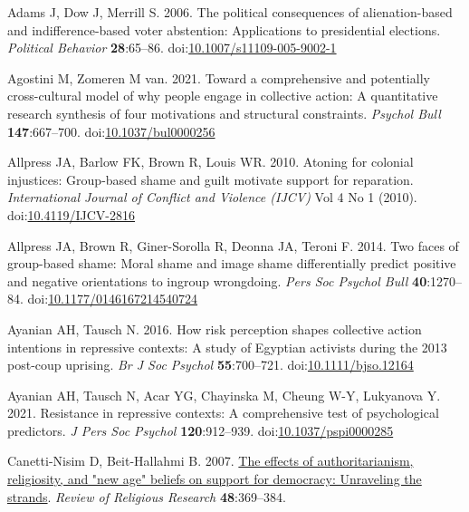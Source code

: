 \documentclass[
]{article}
\newlength{\cslhangindent}
\newenvironment{CSLReferences}[2] %
 {\begin{list}{}{%
  \setlength{\itemindent}{0pt}
  \setlength{\leftmargin}{0pt}
  \setlength{\parsep}{0pt}
  \ifodd #1
   \setlength{\leftmargin}{\cslhangindent}
   \setlength{\itemindent}{-1\cslhangindent}
  \fi
  \setlength{\itemsep}{#2\baselineskip}}}
 {\end{list}}
\begin{document}
\label{refs}
\begin{CSLReferences}{1}{0}
Adams J, Dow J, Merrill S. 2006. The political consequences of alienation-based and indifference-based voter abstention: Applications to presidential elections. \emph{Political Behavior} \textbf{28}:65--86. doi:\href{https://doi.org/10.1007/s11109-005-9002-1}{10.1007/s11109-005-9002-1}

Agostini M, Zomeren M van. 2021. Toward a comprehensive and potentially cross-cultural model of why people engage in collective action: A quantitative research synthesis of four motivations and structural constraints. \emph{Psychol Bull} \textbf{147}:667--700. doi:\href{https://doi.org/10.1037/bul0000256}{10.1037/bul0000256}

Allpress JA, Barlow FK, Brown R, Louis WR. 2010. Atoning for colonial injustices: Group-based shame and guilt motivate support for reparation. \emph{International Journal of Conflict and Violence (IJCV)} Vol 4 No 1 (2010). doi:\href{https://doi.org/10.4119/IJCV-2816}{10.4119/IJCV-2816}

Allpress JA, Brown R, Giner-Sorolla R, Deonna JA, Teroni F. 2014. Two faces of group-based shame: Moral shame and image shame differentially predict positive and negative orientations to ingroup wrongdoing. \emph{Pers Soc Psychol Bull} \textbf{40}:1270--84. doi:\href{https://doi.org/10.1177/0146167214540724}{10.1177/0146167214540724}

Ayanian AH, Tausch N. 2016. How risk perception shapes collective action intentions in repressive contexts: A study of {Egyptian} activists during the 2013 post-coup uprising. \emph{Br J Soc Psychol} \textbf{55}:700--721. doi:\href{https://doi.org/10.1111/bjso.12164}{10.1111/bjso.12164}

Ayanian AH, Tausch N, Acar YG, Chayinska M, Cheung W-Y, Lukyanova Y. 2021. Resistance in repressive contexts: A comprehensive test of psychological predictors. \emph{J Pers Soc Psychol} \textbf{120}:912--939. doi:\href{https://doi.org/10.1037/pspi0000285}{10.1037/pspi0000285}

Canetti-Nisim D, Beit-Hallahmi B. 2007. \href{http://www.jstor.org/stable/20447457}{The effects of authoritarianism, religiosity, and "new age" beliefs on support for democracy: Unraveling the strands}. \emph{Review of Religious Research} \textbf{48}:369--384.


\end{CSLReferences}
\end{document}
